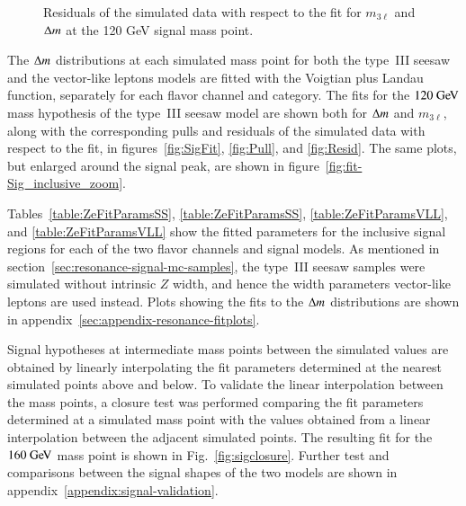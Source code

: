 \begin{figure}[H!]
\begin{minipage}[c]{\textwidth}
{	}
  \caption{Residuals of the simulated data with respect to the fit for $m_{3\ell}$ and $\Delta m$ at the 120 GeV signal mass point. }
  \label{fig:Resid}
\end{minipage}
\label{fig:SigFit120}
\end{figure} 

The $\Delta m$ distributions at each simulated mass point for both the type~III seesaw and the vector-like leptons models are fitted with the Voigtian plus Landau function, separately for each flavor channel and category. The fits for the $120 \GeV$ mass hypothesis of the type~III seesaw model are shown both for $\Delta m$ and  $m_{3\ell}$, along with the corresponding pulls and residuals of the simulated data with respect to the fit, in figures~\ref{fig:SigFit}, \ref{fig:Pull}, and \ref{fig:Resid}. The same plots, but enlarged around the signal peak, are shown in figure~\ref{fig:fit-Sig_inclusive_zoom}. 

Tables~\ref{table:ZeFitParamsSS}, \ref{table:ZeFitParamsSS}, \ref{table:ZeFitParamsVLL}, and \ref{table:ZeFitParamsVLL} show the fitted parameters for the inclusive signal regions for each of the two flavor channels and signal models. As mentioned in section~\ref{sec:resonance-signal-mc-samples}, the type~III seesaw samples were simulated without intrinsic $Z$ width, and hence the width parameters vector-like leptons are used instead. Plots showing the fits to the $\Delta m$ distributions are shown in appendix~\ref{sec:appendix-resonance-fitplots}.

Signal hypotheses at intermediate mass points between the simulated values are obtained by linearly interpolating the fit parameters determined at the nearest simulated points above and below. To validate the linear interpolation between the mass points, a closure test was performed comparing the fit parameters determined at a simulated mass point with the values obtained from a linear interpolation between the adjacent simulated points. The resulting fit for the $160 \GeV$ mass point is shown in Fig.~\ref{fig:sigclosure}. Further test and comparisons between the signal shapes of the two models are shown in appendix~\ref{appendix:signal-validation}.

